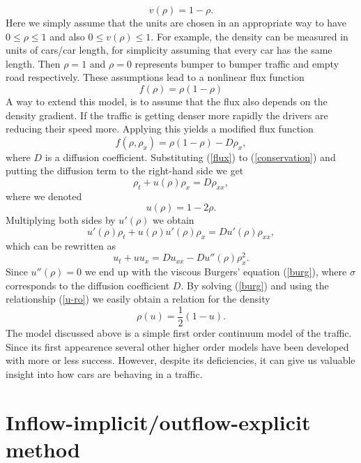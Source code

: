 \documentclass[a4paper,12pt,twoside]{report}%
\begin{document}
\[
v(\rho) = 1-\rho.
\]
Here we simply assume that the units are chosen in an appropriate way to have $ 0 \leq \rho \leq 1 $ and also $ 0 \leq v(\rho) \leq 1 $. For example, the density can be measured in units of cars/car length, for simplicity assuming that every car has the same length. Then $ \rho = 1 $ and $ \rho = 0 $ represents bumper to bumper traffic and empty road respectively.
These assumptions lead to a nonlinear flux function
\[
f(\rho) = \rho \left(1 - \rho \right) 
\]
A way to extend this model, is to assume that the flux also depends on the density gradient. If the traffic is getting denser more rapidly the drivers are reducing their speed more. Applying this yields a modified flux function
\begin{equation}
	f(\rho, \rho_x) = \rho \left(1 - \rho\right) - D \rho_x,
	\label{flux}
\end{equation}
where $ D $ is a diffusion coefficient. Substituting (\ref{flux}) to (\ref{conservation}) and putting the diffusion term to the right-hand side we get
\begin{equation}
	\rho_t + u(\rho)\rho_x = D \rho_{xx},
	\label{traffic}
\end{equation}
where we denoted
\begin{equation}
	u(\rho) = 1 - 2\rho.
	\label{u-ro}
\end{equation}
Multiplying both sides by $ u'(\rho) $ we obtain
\[ u'(\rho)\rho_t + u(\rho)u'(\rho)\rho_x = D u'(\rho)\rho_{xx},\]
which can be rewritten as
\[ u_t + uu_x = D u_{xx} - D u''(\rho) \rho_x^2. \]
Since $ u''(\rho) = 0 $ we end up with the viscous Burgers' equation (\ref{burg}), where $ \sigma $ corresponds to the diffusion coefficient $ D $. By solving (\ref{burg}) and using the relationship (\ref{u-ro}) we easily obtain a relation for the density
\begin{equation}
	\rho(u) = \frac{1}{2}\left(1 - u\right).
	\label{ro-u}
\end{equation}
The model discussed above is a simple first order continuum model of the traffic. Since its first appearence several other higher order models have been developed with more or less success.
However, despite its deficiencies, it can give us valuable insight into how cars are behaving in a traffic.

\chapter{Inflow-implicit\slash outflow-explicit method\label{worksummary}}
\end{document}
